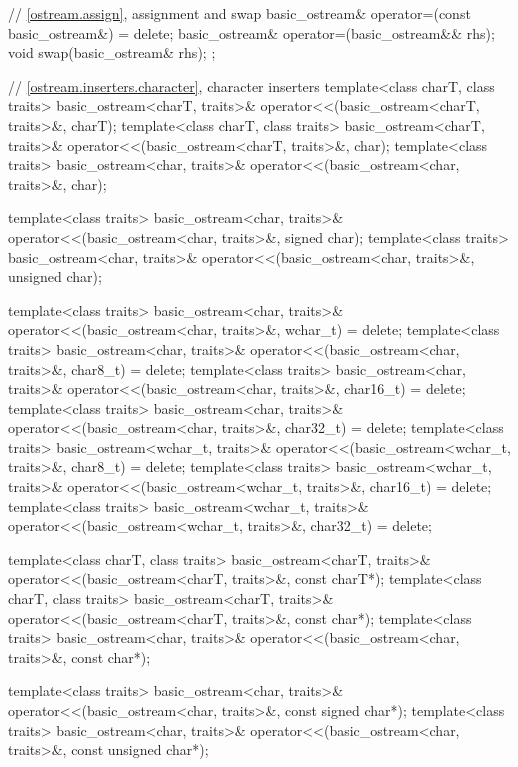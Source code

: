\begin{codeblock}
{{    // \ref{ostream.assign}, assignment and swap
    basic_ostream& operator=(const basic_ostream&) = delete;
    basic_ostream& operator=(basic_ostream&& rhs);
    void swap(basic_ostream& rhs);
  };

  // \ref{ostream.inserters.character}, character inserters
  template<class charT, class traits>
    basic_ostream<charT, traits>& operator<<(basic_ostream<charT, traits>&, charT);
  template<class charT, class traits>
    basic_ostream<charT, traits>& operator<<(basic_ostream<charT, traits>&, char);
  template<class traits>
    basic_ostream<char, traits>& operator<<(basic_ostream<char, traits>&, char);

  template<class traits>
    basic_ostream<char, traits>& operator<<(basic_ostream<char, traits>&, signed char);
  template<class traits>
    basic_ostream<char, traits>& operator<<(basic_ostream<char, traits>&, unsigned char);

  template<class traits>
    basic_ostream<char, traits>& operator<<(basic_ostream<char, traits>&, wchar_t) = delete;
  template<class traits>
    basic_ostream<char, traits>& operator<<(basic_ostream<char, traits>&, char8_t) = delete;
  template<class traits>
    basic_ostream<char, traits>& operator<<(basic_ostream<char, traits>&, char16_t) = delete;
  template<class traits>
    basic_ostream<char, traits>& operator<<(basic_ostream<char, traits>&, char32_t) = delete;
  template<class traits>
    basic_ostream<wchar_t, traits>&
      operator<<(basic_ostream<wchar_t, traits>&, char8_t) = delete;
  template<class traits>
    basic_ostream<wchar_t, traits>&
      operator<<(basic_ostream<wchar_t, traits>&, char16_t) = delete;
  template<class traits>
    basic_ostream<wchar_t, traits>&
      operator<<(basic_ostream<wchar_t, traits>&, char32_t) = delete;

  template<class charT, class traits>
    basic_ostream<charT, traits>& operator<<(basic_ostream<charT, traits>&, const charT*);
  template<class charT, class traits>
    basic_ostream<charT, traits>& operator<<(basic_ostream<charT, traits>&, const char*);
  template<class traits>
    basic_ostream<char, traits>& operator<<(basic_ostream<char, traits>&, const char*);

  template<class traits>
    basic_ostream<char, traits>& operator<<(basic_ostream<char, traits>&, const signed char*);
  template<class traits>
    basic_ostream<char, traits>& operator<<(basic_ostream<char, traits>&, const unsigned char*);

}
\end{codeblock}
